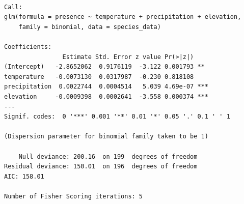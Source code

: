 \documentclass[
  letterpaper,
]{book}
\begin{document}
\begin{verbatim}

Call:
glm(formula = presence ~ temperature + precipitation + elevation, 
    family = binomial, data = species_data)

Coefficients:
                Estimate Std. Error z value Pr(>|z|)    
(Intercept)   -2.8652062  0.9176119  -3.122 0.001793 ** 
temperature   -0.0073130  0.0317987  -0.230 0.818108    
precipitation  0.0022744  0.0004514   5.039 4.69e-07 ***
elevation     -0.0009398  0.0002641  -3.558 0.000374 ***
---
Signif. codes:  0 '***' 0.001 '**' 0.01 '*' 0.05 '.' 0.1 ' ' 1

(Dispersion parameter for binomial family taken to be 1)

    Null deviance: 200.16  on 199  degrees of freedom
Residual deviance: 150.01  on 196  degrees of freedom
AIC: 158.01

Number of Fisher Scoring iterations: 5
\end{verbatim}
\end{document}
